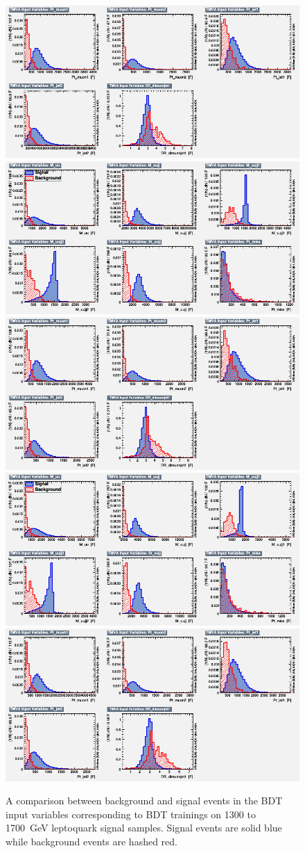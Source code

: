 \begin{figure}[H]
    {\includegraphics[width=.49\textwidth]{Images/Analysis/Results_LQToBMu_pair_uubj_BDTG_FullRun2_2023_01_25_020318/1500/variables_id_c2.png}}
    {\includegraphics[width=.49\textwidth]{Images/Analysis/Results_LQToBMu_pair_uubj_BDTG_FullRun2_2023_01_25_020318/1600/variables_id_c1.png}}
    {\includegraphics[width=.49\textwidth]{Images/Analysis/Results_LQToBMu_pair_uubj_BDTG_FullRun2_2023_01_25_020318/1600/variables_id_c2.png}}
    {\includegraphics[width=.49\textwidth]{Images/Analysis/Results_LQToBMu_pair_uubj_BDTG_FullRun2_2023_01_25_020318/1700/variables_id_c1.png}}
    {\includegraphics[width=.49\textwidth]{Images/Analysis/Results_LQToBMu_pair_uubj_BDTG_FullRun2_2023_01_25_020318/1700/variables_id_c2.png}}
    \caption{A comparison between background and signal events in the BDT input variables corresponding to BDT trainings on 1300 to \SI{1700}{GeV} leptoquark signal samples. Signal events are solid blue while background events are hashed red.}
    \label{figapp:variables3}
\end{figure}

